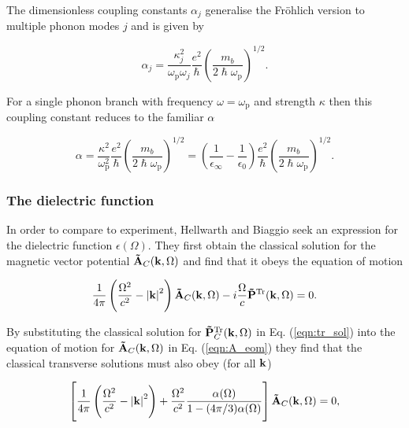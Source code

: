 The dimensionless coupling constants $\alpha_j$ generalise the Fr\"ohlich version to multiple phonon modes $j$ and is given by

\begin{equation}
    \alpha_j = \frac{\kappa_j^2}{\omega_{\text{p}} \omega_j} \frac{e^2}{\hslash} \left( \frac{m_b}{2 \hslash \omega_{\text{p}}} \right)^{1/2}.
\end{equation}

For a single phonon branch with frequency $\omega = \omega_{\text{p}}$ and strength $\kappa$ then this coupling constant reduces to the familiar $\alpha$

\begin{equation}
    \alpha = \frac{\kappa^2}{\omega^2_{\text{p}}} \frac{e^2}{\hslash} \left( \frac{m_b}{2\hslash\omega_{\text{p}}} \right)^{1/2} = \left( \frac{1}{\epsilon_\infty} - \frac{1}{\epsilon_0} \right) \frac{e^2}{\hslash} \left( \frac{m_b}{2\hslash\omega_{\text{p}}} \right)^{1/2}.
\end{equation}

\subsubsection{The dielectric function}

In order to compare to experiment, Hellwarth and Biaggio seek an expression for the dielectric  function $\epsilon(\Omega)$. They first obtain the classical solution for the magnetic vector potential $\vb{\Tilde{A}}_C(\vb{k}, \Omega)$ and find that it obeys the equation of motion 

\begin{equation}\label{eqn:A_eom}
    \frac{1}{4\pi} \left( \frac{\Omega^2}{c^2} - \abs{\vb{k}}^2 \right) \vb{\Tilde{A}}_C(\vb{k}, \Omega) - i \frac{\Omega}{c} \vb{\Tilde{P}}^{\text{Tr}}(\vb{k}, \Omega) = 0.
\end{equation}

By substituting the classical solution for $\vb{\Tilde{P}}^{\text{Tr}}_{C}(\vb{k}, \Omega)$ in Eq. (\ref{eqn:tr_sol}) into the equation of motion for $\vb{\Tilde{A}}_C(\vb{k}, \Omega)$ in Eq. (\ref{eqn:A_eom}) they find that the classical transverse solutions must also obey (for all $\vb{k}$)

\begin{equation}
    \left[ \frac{1}{4\pi} \left( \frac{\Omega^2}{c^2} - \abs{\vb{k}}^2 \right) + \frac{\Omega^2}{c^2} \frac{\alpha(\Omega)}{1 - (4\pi / 3) \alpha(\Omega)} \right] \vb{\Tilde{A}}_C(\vb{k}, \Omega) = 0,
\end{equation}

